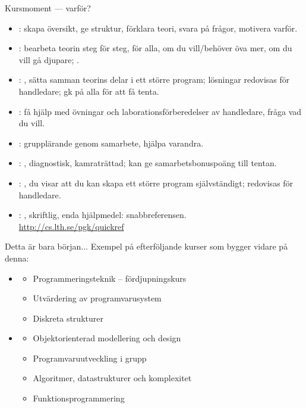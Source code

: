 \begin{Slide}{Kursmoment --- varför?}\SlideOnly{\footnotesize}
\begin{itemize}

\item {}: skapa översikt, ge struktur, förklara teori, svara på frågor, motivera varför.

\item {}: bearbeta teorin steg för steg,  för alla,  om du vill/behöver öva mer,  om du vill gå djupare; .

\item {}: , sätta samman teorins delar i ett större program; lösningar redovisas för handledare; gk på alla för att få tenta.

\item {}: få hjälp med övningar och laborationsförberedelser av handledare, fråga vad du vill.

\item {}: grupplärande genom samarbete, hjälpa varandra.

\item {}: , diagnostisk, kamraträttad; kan ge samarbetsbonuspoäng till tentan.

\item {}: , du visar att du kan skapa ett större program självständigt; redovisas för handledare.

\item {}: , skriftlig, enda hjälpmedel: snabbreferensen.\\   \url{http://cs.lth.se/pgk/quickref}
\end{itemize}
\end{Slide}

\ifkompendium\else
\begin{SlideExtra}{Detta är bara början... }
Exempel på efterföljande kurser som bygger vidare på denna:
\begin{itemize}
\item {}
\begin{itemize}
\item Programmeringsteknik -- fördjupningskurs
\item Utvärdering av programvarusystem
\item Diskreta strukturer
\end{itemize}
\item {}
\begin{itemize}
\item Objektorienterad modellering och design
\item Programvaruutveckling i grupp
\item Algoritmer, datastrukturer och komplexitet
\item Funktionsprogrammering
\end{itemize}
\end{itemize}
\end{SlideExtra}


